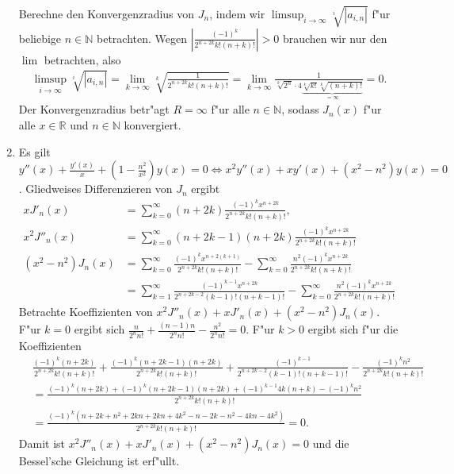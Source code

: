 \documentclass[a4paper, landscape,twocolumn,8pt]{scrartcl}
\theoremstyle{plain}
\begin{document}
\begin{enumerate}[label=(\roman*)]
    Berechne den Konvergenzradius von $J_n$, indem wir $\limsup_{i \to \infty} \sqrt[i]{|a_{i,n}|}$ f"ur beliebige $n \in \mathbb N$ betrachten. Wegen $|\frac{(-1)^k}{2^{n+2k}k!(n+k)!}| > 0$ brauchen wir nur den $\lim$ betrachten, also
    \begin{align*}
        \limsup_{i \to \infty} \sqrt[i]{|a_{i,n}|} = \lim_{k \to \infty} \sqrt[k]{\frac{1}{2^{n+2k}k!(n+k)!}} = \lim_{k \to \infty} \frac{1}{\sqrt[k]{2^n}\cdot4\underbrace{\sqrt[k]{k!}\sqrt[k]{(n+k)!}}_{=\infty}} = 0.
    \end{align*}
    Der Konvergenzradius betr"agt $R = \infty$ f"ur alle $n \in \mathbb N$, sodass $J_n(x)$ f"ur alle $x \in \mathbb R$ und $n \in \mathbb N$ konvergiert.
    \item Es gilt $y''(x)+\frac{y'(x)}{x}+(1-\frac{n^2}{x^2})y(x)=0 \iff x^2y''(x)+xy'(x)+(x^2-n^2)y(x)=0$. Gliedweises Differenzieren von $J_n$ ergibt
    \begin{align*}
        xJ'_n(x) &= \sum^{\infty}_{k=0}(n+2k)\frac{(-1)^kx^{n+2k}}{2^{n+2k}k!(n+k)!},\\
        x^2J''_n(x) &= \sum^{\infty}_{k=0}(n+2k-1)(n+2k)\frac{(-1)^kx^{n+2k}}{2^{n+2k}k!(n+k)!} \\
        (x^2-n^2)J_n(x) &= \sum^{\infty}_{k=0}\frac{(-1)^kx^{n+2(k+1)}}{2^{n+2k}k!(n+k)!} - \sum^{\infty}_{k=0}\frac{n^2(-1)^kx^{n+2k}}{2^{n+2k}k!(n+k)!}\\
        &= \sum^{\infty}_{k=1}\frac{(-1)^{k-1}x^{n+2k}}{2^{n+2k-2}(k-1)!(n+k-1)!} - \sum^{\infty}_{k=0}\frac{n^2(-1)^kx^{n+2k}}{2^{n+2k}k!(n+k)!}
    \end{align*}
    Betrachte Koeffizienten von $x^2J''_n(x)+xJ'_n(x)+(x^2-n^2)J_n(x)$. F"ur $k=0$ ergibt sich $\frac{n}{2^nn!} + \frac{(n-1)n}{2^nn!} - \frac{n^2}{2^nn!} = 0.$ F"ur $k>0$ ergibt sich f"ur die Koeffizienten
    \begin{align*}
        &\frac{(-1)^k(n+2k)}{2^{n+2k}k!(n+k)!} + \frac{(-1)^k(n+2k-1)(n+2k)}{2^{n+2k}k!(n+k)!} + \frac{(-1)^{k-1}}{2^{n+2k-2}(k-1)!(n+k-1)!} - \frac{(-1)^kn^2}{2^{n+2k}k!(n+k)!}\\
        &= \frac{(-1)^k(n+2k)+(-1)^k(n+2k-1)(n+2k)+(-1)^{k-1}4k(n+k)-(-1)^kn^2}{2^{n+2k}k!(n+k)!}\\
        &= \frac{(-1)^k(n+2k+n^2+2kn+2kn+4k^2-n-2k-n^2-4kn-4k^2)}{2^{n+2k}k!(n+k)!} = 0.
    \end{align*}
    Damit ist $x^2J''_n(x)+xJ'_n(x)+(x^2-n^2)J_n(x)=0$ und die Bessel'sche Gleichung ist erf"ullt.
\end{enumerate}
\end{document}
